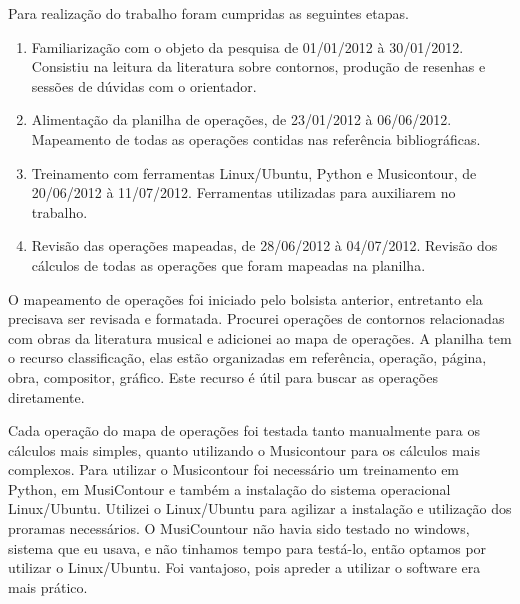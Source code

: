 \documentclass[11pt]{article}
\begin{document}
Para realização do trabalho foram cumpridas as seguintes etapas.

\begin{enumerate}
\item Familiarização com o objeto da pesquisa de 01/01/2012 à 30/01/2012.
Consistiu na leitura da literatura sobre contornos, produção de resenhas
e sessões de dúvidas com o orientador.
\item Alimentação da planilha de operações, de 23/01/2012 à 06/06/2012.
Mapeamento de todas as operações contidas nas referência
bibliográficas.
\item Treinamento com ferramentas Linux/Ubuntu, Python e Musicontour, de 20/06/2012 à 11/07/2012.
Ferramentas utilizadas para auxiliarem no trabalho.
\item Revisão das operações mapeadas, de 28/06/2012 à 04/07/2012.
Revisão dos cálculos de todas as operações que foram mapeadas na planilha.
\end{enumerate}

O mapeamento de operações foi iniciado pelo bolsista anterior, entretanto ela
precisava ser revisada e formatada.  Procurei operações de
contornos relacionadas com obras da literatura musical e adicionei ao
mapa de operações. A planilha tem o recurso classificação, elas estão
organizadas em referência, operação, página, obra, compositor,
gráfico.
Este recurso é útil para buscar as operações diretamente.

Cada operação do mapa de operações foi testada tanto manualmente para os
cálculos mais simples, quanto utilizando o Musicontour para os cálculos mais
complexos. Para utilizar o Musicontour foi necessário um treinamento em Python, 
em MusiContour e também a instalação do sistema operacional Linux/Ubuntu. Utilizei o Linux/Ubuntu para 
agilizar a instalação e utilização dos proramas necessários. O MusiCountour não
havia sido testado no windows, sistema que eu usava, e não
tinhamos tempo para testá-lo, então optamos por utilizar o Linux/Ubuntu. Foi
vantajoso, pois apreder a utilizar o software era mais prático.
\end{document}
